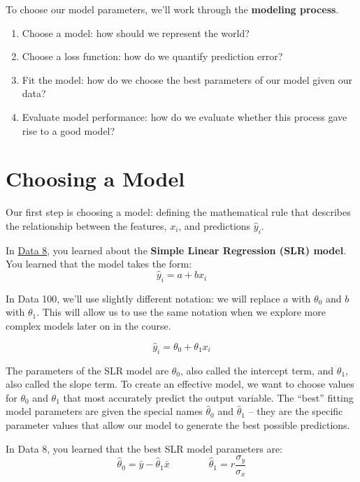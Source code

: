\documentclass[
  letterpaper,
  DIV=11,
  numbers=noendperiod]{scrreprt}
\providecommand{\tightlist}{%
  \setlength{\itemsep}{0pt}\setlength{\parskip}{0pt}}\usepackage{longtable,booktabs,array}
\begin{document}
To choose our model parameters, we'll work through the \textbf{modeling
process}.

\begin{enumerate}
\def\labelenumi{\arabic{enumi}.}
\tightlist
\item
  Choose a model: how should we represent the world?
\item
  Choose a loss function: how do we quantify prediction error?
\item
  Fit the model: how do we choose the best parameters of our model given
  our data?
\item
  Evaluate model performance: how do we evaluate whether this process
  gave rise to a good model?
\end{enumerate}

\hypertarget{choosing-a-model}{%
\section{Choosing a Model}\label{choosing-a-model}}

Our first step is choosing a model: defining the mathematical rule that
describes the relationship between the features, \(x_i\), and
predictions \(\hat{y}_i\).

In
\href{https://inferentialthinking.com/chapters/15/4/Least_Squares_Regression.html}{Data
8}, you learned about the \textbf{Simple Linear Regression (SLR) model}.
You learned that the model takes the form: \[\hat{y}_i = a + bx_i\]

In Data 100, we'll use slightly different notation: we will replace
\(a\) with \(\theta_0\) and \(b\) with \(\theta_1\). This will allow us
to use the same notation when we explore more complex models later on in
the course.

\[\hat{y}_i = \theta_0 + \theta_1 x_i\]

The parameters of the SLR model are \(\theta_0\), also called the
intercept term, and \(\theta_1\), also called the slope term. To create
an effective model, we want to choose values for \(\theta_0\) and
\(\theta_1\) that most accurately predict the output variable. The
``best'' fitting model parameters are given the special names
\(\hat{\theta}_0\) and \(\hat{\theta}_1\) -- they are the specific
parameter values that allow our model to generate the best possible
predictions.

In Data 8, you learned that the best SLR model parameters are:
\[\hat{\theta}_0 = \bar{y} - \hat{\theta}_1\bar{x} \qquad \qquad \hat{\theta}_1 = r \frac{\sigma_y}{\sigma_x}\]
\end{document}
